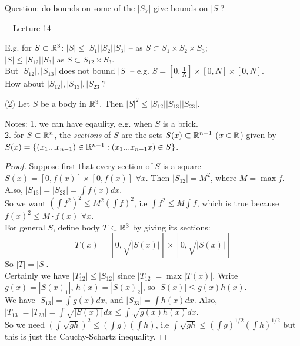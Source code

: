 \documentclass[a4paper]{article}
\begin{document}
Question: do bounds on some of the $|S_Y|$ give bounds on $|S|$?

---Lecture 14---

E.g. for $S \subset \mathbb{R}^3$: $|S| \leq |S_1| |S_2| |S_3|$ -- as $S \subset S_1 \times S_2 \times S_3$;\\
$|S| \leq |S_{12}| |S_3|$ as $S \subset S_{12} \times S_3$.\\
But $|S_{12}|,|S_{13}|$ does not bound $|S|$ -- e.g. $S=[0,\frac{1}{N}] \times [0,N] \times [0,N]$.\\
How about $|S_{12}|,|S_{13}|,|S_{23}|$?

\begin{prop} (2)
    Let $S$ be a body in $\mathbb{R}^3$. Then $|S|^2 \leq |S_{12}||S_{13}||S_{23}|$.

    Notes: 1. we can have eqaulity, e.g. when $S$ is a brick.\\
    2. for $S \subset \mathbb{R}^n$, the \emph{sections} of $S$ are the sets $S(x) \subset \mathbb{R}^{n-1}$ ($x \in \mathbb{R}$) given by $S(x) = \{(x_1...x_{n-1}) \in \mathbb{R}^{n-1}:(x_1...x_{n-1}x) \in S\}$.

    \begin{proof}
        Suppose first that every section of $S$ is a square -- $S(x) =[0,f(x)] \times [0,f(x)]$ $\forall x$. Then $|S_{12}| = M^2$, where $M=\max f$. Also, $|S_{13}| = |S_{23}| = \int f(x) dx$.\\
        So we want $(\int f^2)^2 \leq M^2 (\int f)^2$, i.e $\int f^2 \leq M \int f$, which is true because $f(x)^2 \leq M \cdot f(x)$ $\forall x$.\\
        For general $S$, define body $T \subset \mathbb{R}^3$ by giving its sections:
        $$T(x) = [0,\sqrt{|S(x)|}] \times [0,\sqrt{|S(x)|}]$$
        So $|T| = |S|$.\\
        Certainly we have $|T_{12}| \leq |S_{12}|$ since $|T_{12}| = \max |T(x)|$. Write $g(x) = |S(x)_1|$, $h(x) = |S(x)_2|$, so $|S(x)| \leq g(x)h(x)$.\\
        We have $|S_{13}| = \int g(x) dx$, and $|S_{23}| = \int h(x) dx$. Also, $|T_{13}| = |T_{23}| = \int \sqrt{|S(x)|} dx \leq \int \sqrt{g(x)h(x)} dx$.\\
        So we need $(\int \sqrt{gh})^2 \leq (\int g)(\int h)$, i.e $\int \sqrt{gh} \leq (\int g)^{1/2} (\int h)^{1/2}$ but this is just the Cauchy-Schartz inequality.
    \end{proof}
\end{prop}
\end{document}
